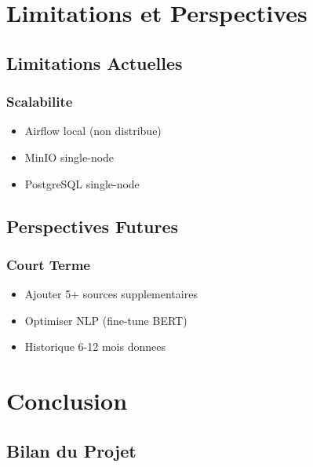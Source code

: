 \documentclass[12pt,a4paper]{report}
\begin{document}

\chapter{Limitations et Perspectives}

\section{Limitations Actuelles}

\subsection{Scalabilite}

\begin{itemize}
    \item Airflow local (non distribue)
    \item MinIO single-node
    \item PostgreSQL single-node
\end{itemize}

\section{Perspectives Futures}

\subsection{Court Terme}

\begin{itemize}
    \item Ajouter 5+ sources supplementaires
    \item Optimiser NLP (fine-tune BERT)
    \item Historique 6-12 mois donnees
\end{itemize}


\chapter{Conclusion}

\section{Bilan du Projet}
\end{document}

